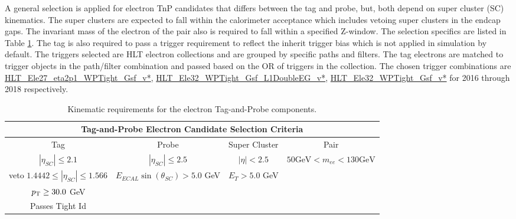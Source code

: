A general selection is applied for electron TnP candidates that differs between the tag and probe, but, both depend on super cluster (SC) kinematics. The super clusters are expected to fall within the calorimeter acceptance which includes vetoing super clusters in the endcap gaps. The invariant mass of the electron of the pair also is required to fall within a specified Z-window. The selection specifics are listed in Table \ref{tab:eleTnPSelect}.  The tag is also required to pass a trigger requirement to reflect the inherit trigger bias which is not applied in simulation by default. The triggers selected are HLT electron collections and are grouped by specific paths and filters. The tag electrons are matched to trigger objects in the path/filter combination and passed based on the OR of triggers in the collection. The chosen trigger combinations are \url{HLT_Ele27_eta2p1_WPTight_Gsf_v*}, \url{HLT_Ele32_WPTight_Gsf_L1DoubleEG_v*}, \url{HLT_Ele32_WPTight_Gsf_v*} for 2016 through 2018 respectively.\\

\begin{table}
\caption{Kinematic requirements for the electron Tag-and-Probe components.}
\label{tab:eleTnPSelect}
\begin{adjustwidth}{-0.45in}{-1in}
\begin{tabular}{|c|c|c|c|}
\hline 
\multicolumn{4}{|c|}{Tag-and-Probe Electron Candidate Selection Criteria} \\ 
\hline 
Tag & Probe & Super Cluster & Pair \\ 
\hline 
$|\eta_{SC}| \leq 2.1$ & $|\eta_{SC}| \leq 2.5$  & $|\eta|<2.5 $ & $50 \text{GeV} < m_{ee} < 130 \text{GeV} $ \\
veto $ 1.4442 \leq |\eta_{SC}| \leq 1.566 $ & $E_{ECAL}\sin(\theta_{SC}) > 5.0 $ GeV & $E_T > 5.0 $ GeV &  \\
 $p_{\mathrm{T}} \geq 30.0$ GeV &  &  &  \\
 Passes Tight Id &  &  & \\
\hline 
\end{tabular} 
\end{adjustwidth}
\end{table}





